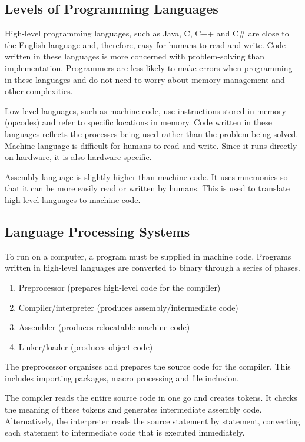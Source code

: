 \subsection{Levels of Programming Languages}

High-level programming languages, such as Java, C, C++ and C\# are close to the English language and, therefore, easy for humans to read and write.
Code written in these languages is more concerned with problem-solving than implementation.
Programmers are less likely to make errors when programming in these languages and do not need to worry about memory management and other complexities.

Low-level languages, such as machine code, use instructions stored in memory (opcodes) and refer to specific locations in memory.
Code written in these languages reflects the processes being used rather than the problem being solved.
Machine language is difficult for humans to read and write.
Since it runs directly on hardware, it is also hardware-specific.

Assembly language is slightly higher than machine code.
It uses mnemonics so that it can be more easily read or written by humans.
This is used to translate high-level languages to machine code.

\subsection{Language Processing Systems}

To run on a computer, a program must be supplied in machine code.
Programs written in high-level languages are converted to binary through a series of phases.

\begin{enumerate}
  \item Preprocessor (prepares high-level code for the compiler)
  \item Compiler/interpreter (produces assembly/intermediate code)
  \item Assembler (produces relocatable machine code)
  \item Linker/loader (produces object code)
\end{enumerate}

The preprocessor organises and prepares the source code for the compiler.
This includes importing packages, macro processing and file inclusion.

The compiler reads the entire source code in one go and creates tokens.
It checks the meaning of these tokens and generates intermediate assembly code.
Alternatively, the interpreter reads the source statement by statement, converting each statement to intermediate code that is executed immediately.

